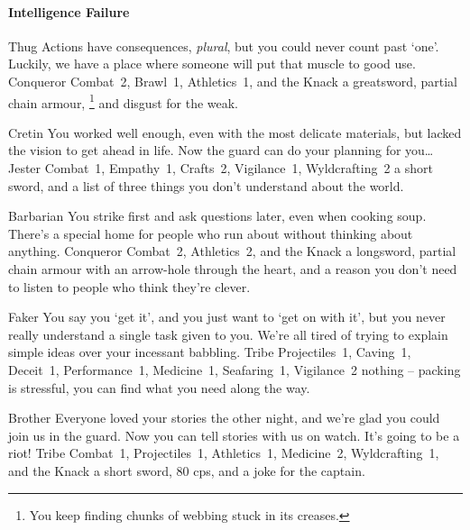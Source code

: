 \begin{multicols}{2}
\begin{itemize}
\end{itemize}

\paragraph{Intelligence Failure}

\begin{itemize}

  {Thug}%
  {Actions have consequences, \emph{plural}, but you could never count past `one'.
  Luckily, we have a place where someone will put that muscle to good use.
  }%
  {Conqueror}%
  {Combat~2, Brawl~1, Athletics~1, and the Knack \adrenalinesurge}%
  {a greatsword, partial chain armour,%
  \footnote{You keep finding chunks of webbing stuck in its creases.}
  and disgust for the weak.}%

  {Cretin}%
  {You worked well enough, even with the most delicate materials, but lacked the vision to get ahead in life.
  Now the \gls{guard} can do your planning for you\ldots
  }%
  {Jester}%
  {Combat~1, Empathy~1, Crafts~2, Vigilance~1, Wyldcrafting~2}%
  {a short sword, and a list of three things you don't understand about the world.}%


  {Barbarian}%
  {You strike first and ask questions later, even when cooking soup.
  There's a special home for people who run about without thinking about anything.
  }%
  {Conqueror}%
  {Combat~2, Athletics~2, and the Knack \laststand}%
  {a longsword, partial chain armour with an arrow-hole through the heart, and a reason you don't need to listen to people who think they're clever.}%


  {Faker}%
  {You say you `get it', and you just want to `get on with it', but you never really understand a single task given to you.
  We're all tired of trying to explain simple ideas over your incessant babbling.
  }%
  {Tribe}%
  {Projectiles~1, Caving~1, Deceit~1, Performance~1, Medicine~1, Seafaring~1, Vigilance~2}%
  {nothing -- packing is stressful, you can find what you need along the way.}%

  {Brother}%
  {Everyone loved your stories the other night, and we're glad you could join us in the \gls{guard}.
  Now you can tell stories with us on watch.
  It's going to be a riot!
  }%
  {Tribe}%
  {Combat~1, Projectiles~1, Athletics~1, Medicine~2, Wyldcrafting~1, and the Knack \guardian}%
  {a short sword, 80 \glspl{cp}, and a joke for the captain.}%



\end{itemize}
\end{multicols}
